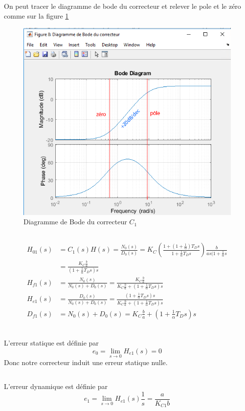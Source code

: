 \documentclass{article}
\begin{document}
\subsection{}
On peut tracer le diagramme de bode du correcteur et relever le pole et le zéro comme sur la figure \ref{fig:bode133}
\begin{figure}[h]
    \centering
    \includegraphics[width=0.5\linewidth]{bode133.png}
    \caption{Diagramme de Bode du correcteur $C_1$}
    \label{fig:bode133}
\end{figure}
\subsection{}
\begin{align*}
    H_{01}(s)&=C_1(s)H(s)=\frac{N_0(s)}{D_0(s)}=K_C\left(\frac{1+(1+\frac{1}{\alpha})T_Ds}{1+\frac{1}{\alpha}T_Ds}\right)\frac{b}{as(1+\frac{1}{\alpha}s}\\
    &=\frac{K_C\frac{b}{a}}{(1+\frac{1}{\alpha}T_Ds)s}\\
    H_{f1}(s)&=\frac{N_0(s)}{N_0(s)+D_0(s)}=\frac{K_C\frac{b}{a}}{K_C\frac{b}{a}+(1+\frac{1}{\alpha}T_Ds)s}\\
    H_{e1}(s)&=\frac{D_0(s)}{N_0(s)+D_0(s)}=\frac{(1+\frac{1}{\alpha}T_Ds)s}{K_C\frac{b}{a}+(1+\frac{1}{\alpha}T_Ds)s}\\
    D_{f1}(s)&=N_0(s)+D_0(s)=K_C\frac{b}{a}+(1+\frac{1}{\alpha}T_Ds)s\\
\end{align*}
\subsection{}
L'erreur statique est définie par 
\begin{equation*}
    e_0=\lim_{s\rightarrow0}H_{e1}(s)=0
\end{equation*}
Donc notre correcteur induit une erreur statique nulle.
\subsection{}
L'erreur dynamique est définie par 
\begin{equation*}
    e_1=\lim_{s\rightarrow0}H_{e1}(s)\frac{1}{s}=\frac{a}{K_{C1}b}
\end{equation*}
\end{document}
